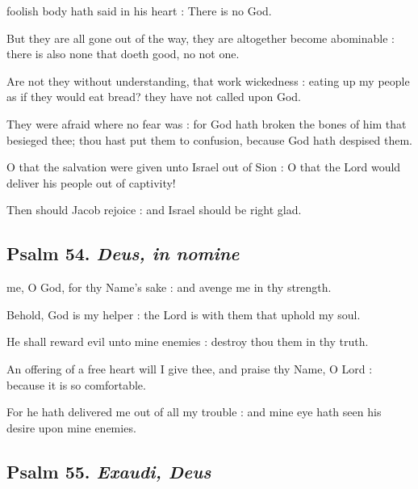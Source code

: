  foolish body hath said in his heart : There is no God.\par
{}
But they are all gone out of the way, they are altogether become abominable : there is also none that doeth good, no not one.\par
{}Are not they without understanding, that work wickedness : eating up my people as if they would eat bread? they have not called upon God.\par
{}They were afraid where no fear was : for God hath broken the bones of him that besieged thee; thou hast put them to confusion, because God hath despised them.\par
{}O that the salvation were given unto Israel out of Sion : O that the Lord would deliver his people out of captivity!\par
{}Then should Jacob rejoice : and Israel should be right glad.\par

\subsection{Psalm 54. \textit{Deus, in nomine}}

 me, O God, for thy Name's sake : and avenge me in thy strength.\par
{}
Behold, God is my helper : the Lord is with them that uphold my soul.\par
{}He shall reward evil unto mine enemies : destroy thou them in thy truth.\par
{}An offering of a free heart will I give thee, and praise thy Name, O Lord : because it is so comfortable.\par
{}For he hath delivered me out of all my trouble : and mine eye hath seen his desire upon mine enemies.\par

\subsection{Psalm 55. \textit{Exaudi, Deus}}

